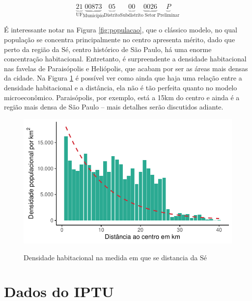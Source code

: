 \begin{equation*}
    \underbrace{21}_\text{UF} \underbrace{00873}_\text{Município} \underbrace{05}_\text{Distrito} \underbrace{00}_\text{Subdistrito} \underbrace{0026}_\text{Setor} \underbrace{P}_\text{Preliminar}
    \label{eq:setor}
\end{equation*}

É interessante notar na Figura \ref{fig:populacao}, que o clássico modelo, no qual população se concentra principalmente no centro apresenta mérito, dado que perto da região da Sé, centro histórico de São Paulo, há uma enorme concentração habitacional. Entretanto, é surpreendente a densidade habitacional nas favelas de Paraisópolis e Heliópolis, que acabam por ser as áreas mais densas da cidade. Na Figura \ref{fig:dens-distcentro} é possível ver como ainda que haja uma relação entre a densidade habitacional e a distância, ela não é tão perfeita quanto no modelo microeconômico. Paraisópolis, por exemplo, está a 15km do centro e ainda é a região mais densa de São Paulo -- mais detalhes serão discutidos adiante.

\begin{figure}[h]
    \centering
    \caption{Densidade habitacional na medida em que se distancia da Sé}
    \includegraphics[width = .75\linewidth]{imagens/densidade_distcentro.pdf}
    \label{fig:dens-distcentro}
\end{figure}

\section*{Dados do IPTU}

